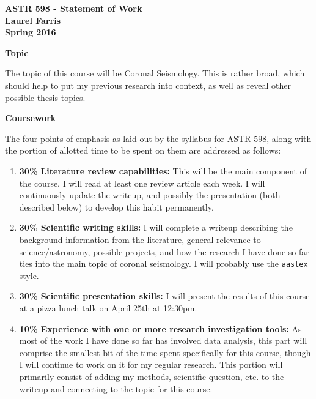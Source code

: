 \documentclass[12pt]{article}
\begin{document}
\begin{centering}
    \Large\textbf{ASTR 598 - Statement of Work\\}
    \vspace{0.5em}
    \large\textbf{Laurel Farris\\}
    \vspace{0.25em}
    \large\textbf{Spring 2016\\}
    \vspace{0.25em}
\end{centering}


\large\textbf{Topic}\normalsize

The topic of this course will be Coronal Seismology. This is
rather broad, which should help to put my previous research into context,
as well as reveal other possible thesis topics.

\large\textbf{Coursework}\normalsize

The four points of emphasis as laid out by the syllabus for ASTR
598, along with the portion of allotted time to be spent on them
are addressed as follows:
\begin{enumerate}
    \item \textbf{30\% Literature review capabilities:} This will be the main
        component of the course. I will read at least one review article
        each week. I will continuously update the writeup, and
        possibly the presentation (both described below)
        to develop this habit permanently.
    \item \textbf{30\% Scientific writing skills:} I will complete a
        writeup describing the
        background information from the literature, general
        relevance to science/astronomy, possible projects, and how the
        research I have done so far ties into the main topic of coronal
        seismology. I will probably use the \texttt{aastex} style.
    \item \textbf{30\% Scientific presentation skills:}
        I will present the results
        of this course at a pizza lunch talk on April 25th at 12:30pm.
    \item \textbf{10\% Experience with one or more research investigation tools:}
        As most of the work I have done so far has involved data analysis, this
        part will comprise the smallest bit of the time spent specifically for
        this course, though I will continue to work on it for my regular
        research. This portion will primarily consist of adding my
        methods, scientific question, etc. to the writeup and
        connecting to the topic for this course.
\end{enumerate}
\end{document}
